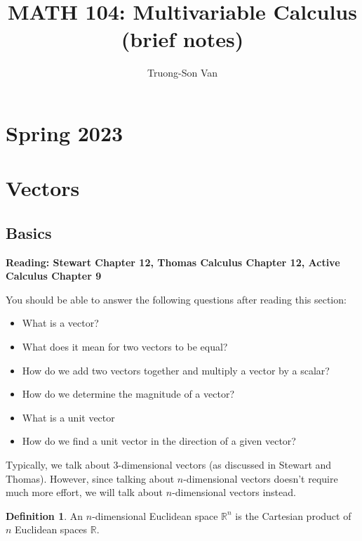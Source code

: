 \documentclass[
]{article}
\title{MATH 104: Multivariable Calculus (brief notes)}
\author{Truong-Son Van}
\date{}
\theoremstyle{definition}
\newtheorem{definition}{Definition}[section]
\theoremstyle{definition}
\theoremstyle{definition}
\theoremstyle{definition}
\theoremstyle{remark}
\begin{document}
\maketitle

{
\setcounter{tocdepth}{2}
\tableofcontents
}
\section*{Spring 2023}\label{spring-2023}

\newpage

\newcommand{\vectorproj}[2][]{\mathrm{proj}_{\vect{#1}}\vect{#2}}
\newcommand{\vectorcomp}[2][]{\mathrm{comp}_{\vect{#1}}\vect{#2}}
\newcommand{\vect}{\mathbf}
\newcommand{\R}{\mathbb{R}}

\section{Vectors}\label{vectors}

\subsection{Basics}\label{basics}

\textbf{Reading: Stewart Chapter 12, Thomas Calculus Chapter 12,
Active Calculus Chapter 9}

You should be able to answer the following questions after reading this section:

\begin{itemize}
\item
  What is a vector?
\item
  What does it mean for two vectors to be equal?
\item
  How do we add two vectors together and multiply a vector by a scalar?
\item
  How do we determine the magnitude of a vector?
\item
  What is a unit vector
\item
  How do we find a unit vector in the direction of a given vector?
\end{itemize}

Typically, we talk about 3-dimensional vectors (as discussed in Stewart and Thomas).
However, since talking about \(n\)-dimensional vectors doesn't
require much more effort,
we will talk about \(n\)-dimensional vectors instead.

\begin{definition}
An \(n\)-dimensional Euclidean space \(\mathbb{R}^n\)
is the Cartesian product of \(n\) Euclidean spaces \(\mathbb{R}\).
\end{definition}
\end{document}
